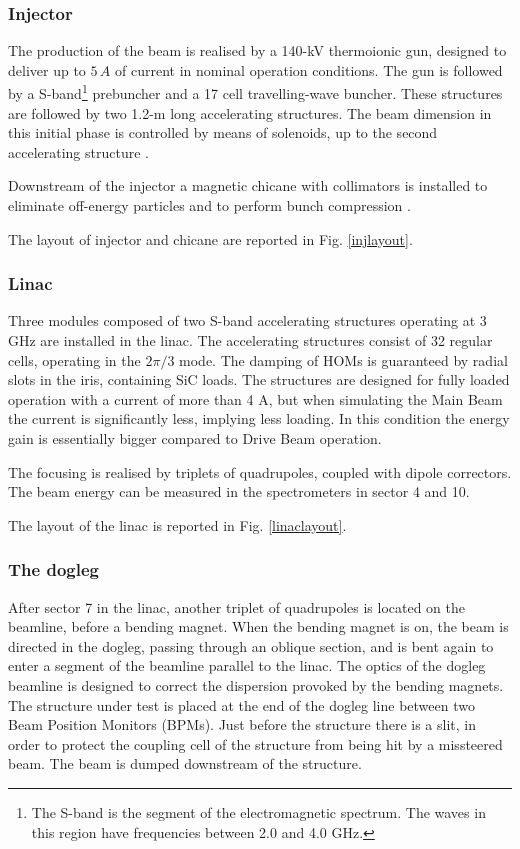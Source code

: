 \subsubsection{Injector}

The production of the beam is realised by a 140-kV thermoionic gun, designed to deliver up to $5\,A$ of current in nominal operation conditions.
The gun is followed by a S-band\footnote{The S-band is the segment of the electromagnetic spectrum. The waves in this region have frequencies between 2.0 and 4.0 GHz.} prebuncher and a 17 cell travelling-wave buncher. These structures are followed by two 1.2-m long accelerating structures. The beam dimension in this initial phase is controlled by means of solenoids, up to the second accelerating structure \cite{ctf:injector}.

Downstream of the injector a magnetic chicane with collimators is installed to eliminate off-energy particles and to perform bunch compression  \cite{Braun:999488}.

The layout of injector and chicane are reported in Fig. \ref{injlayout}.

\subsubsection{Linac}

Three modules composed of two S-band accelerating structures operating at 3 GHz are installed in the linac. The accelerating structures consist of 32 regular cells, operating in the $2\pi/3$ mode. The damping of HOMs is guaranteed by radial slots in the iris, containing SiC loads. The structures are designed for fully loaded operation with a current of more than 4 A, but when simulating the Main Beam the current is significantly less, implying less loading. In this condition the energy gain is essentially bigger compared to Drive Beam operation.

The focusing is realised by triplets of quadrupoles, coupled with dipole correctors. The beam energy can be measured in the spectrometers in sector 4 and 10.

The layout of the linac is reported in Fig. \ref{linaclayout}.

\subsubsection{The dogleg}

After sector 7 in the linac, another triplet of quadrupoles is located on the beamline, before a bending magnet. When the bending magnet is on, the beam is directed in the dogleg, passing through an oblique section, and is bent again to enter a segment of the beamline parallel to the linac. The optics of the dogleg beamline is designed to correct the dispersion provoked by the bending magnets. The structure under test is placed at the end of the dogleg line between two Beam Position Monitors (BPMs). Just before the structure there is a slit, in order to protect the coupling cell of the structure from being hit by a missteered beam. The beam is dumped downstream of the structure.

